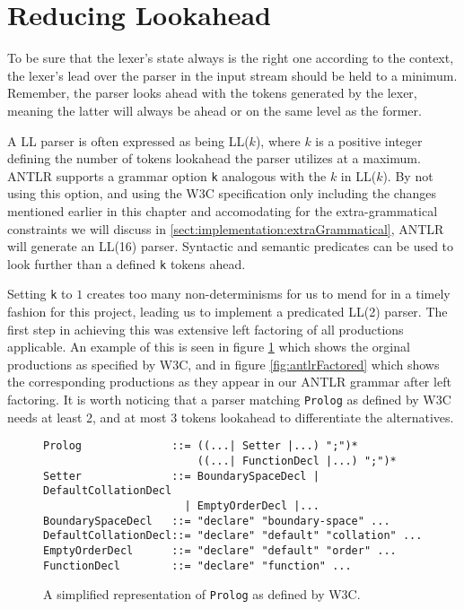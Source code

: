\section{Reducing Lookahead}
\label{sect:implementation:reduceLookahead}
To be sure that the lexer's state always is the right one according to the context, the lexer's lead over the parser in the input stream should be held to a minimum. Remember, the parser looks ahead with the tokens generated by the lexer, meaning the latter will always be ahead or on the same level as the former.

A LL parser is often expressed as being LL($k$), where $k$ is a positive integer defining the number of tokens lookahead the parser utilizes at a maximum. ANTLR supports a grammar option \verb!k! analogous with the $k$ in LL($k$). By not using this option, and using the W3C specification only including the changes mentioned earlier in this chapter and accomodating for the extra-grammatical constraints we will discuss in \ref{sect:implementation:extraGrammatical}, ANTLR will generate an LL(16) parser. Syntactic and semantic predicates can be used to look further than a defined \verb!k! tokens ahead. 

Setting \verb!k! to $1$ creates too many non-determinisms for us to mend for in a timely fashion for this project, leading us to implement a predicated LL(2) parser. The first step in achieving this was extensive left factoring of all productions applicable. An example of this is seen in figure \ref{fig:w3cUnfactored} which shows the orginal productions as specified by W3C, and in figure \ref{fig:antlrFactored} which shows the corresponding productions as they appear in our ANTLR grammar after left factoring. It is worth noticing that a parser matching \verb!Prolog! as defined by W3C needs at least 2, and at most 3 tokens lookahead to differentiate the alternatives.

\begin{figure}[h!]
\begin{Verbatim}
Prolog              ::= ((...| Setter |...) ";")* 
                        ((...| FunctionDecl |...) ";")*
Setter              ::= BoundarySpaceDecl | DefaultCollationDecl 
                      | EmptyOrderDecl |...
BoundarySpaceDecl   ::= "declare" "boundary-space" ...
DefaultCollationDecl::= "declare" "default" "collation" ...
EmptyOrderDecl      ::= "declare" "default" "order" ...
FunctionDecl        ::= "declare" "function" ...
\end{Verbatim}
\label{fig:w3cUnfactored}
\caption[\texttt{Prolog} as defined by W3C]{A simplified representation of \texttt{Prolog} as defined by W3C.}
\end{figure}

